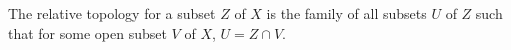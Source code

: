 The relative topology for a subset $Z$ of $X$ is the family of all subsets $U$ of $Z$ such that for some open subset $V$ of $X$, $U = Z \cap V$.
